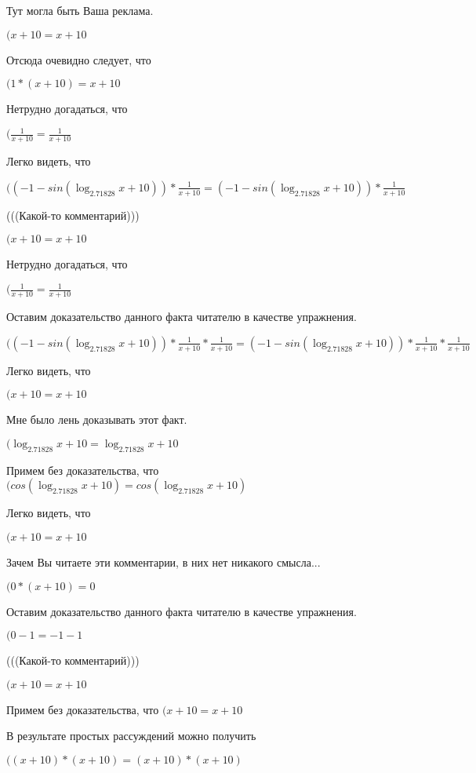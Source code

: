 \documentclass[12pt,a4paper,fleqn]{article}
\theoremstyle{definition}
\begin{document}
Тут могла быть Ваша реклама.

$( x  +  10  =  x  +  10 $

Отсюда очевидно следует, что

$( 1  * ( x  +  10 ) =  x  +  10 $

Нетрудно догадаться, что

$(\frac{ 1 }{ x  +  10 }
 = \frac{ 1 }{ x  +  10 }
$

Легко видеть, что

$(( -1  - sin(\log_{ 2.71828 }{ x  +  10 })) * \frac{ 1 }{ x  +  10 }
 = ( -1  - sin(\log_{ 2.71828 }{ x  +  10 })) * \frac{ 1 }{ x  +  10 }
$

(((Какой-то комментарий)))

$( x  +  10  =  x  +  10 $

Нетрудно догадаться, что

$(\frac{ 1 }{ x  +  10 }
 = \frac{ 1 }{ x  +  10 }
$

Оставим доказательство данного факта читателю в качестве упражнения.

$(( -1  - sin(\log_{ 2.71828 }{ x  +  10 })) * \frac{ 1 }{ x  +  10 }
 * \frac{ 1 }{ x  +  10 }
 = ( -1  - sin(\log_{ 2.71828 }{ x  +  10 })) * \frac{ 1 }{ x  +  10 }
 * \frac{ 1 }{ x  +  10 }
$

Легко видеть, что

$( x  +  10  =  x  +  10 $

Мне было лень доказывать этот факт.

$(\log_{ 2.71828 }{ x  +  10 } = \log_{ 2.71828 }{ x  +  10 }$

Примем без доказательства, что
$(cos(\log_{ 2.71828 }{ x  +  10 }) = cos(\log_{ 2.71828 }{ x  +  10 })$

Легко видеть, что

$( x  +  10  =  x  +  10 $

Зачем Вы читаете эти комментарии, в них нет никакого смысла...

$( 0  * ( x  +  10 ) =  0 $

Оставим доказательство данного факта читателю в качестве упражнения.

$( 0  -  1  =  -1  -  1 $

(((Какой-то комментарий)))

$( x  +  10  =  x  +  10 $

Примем без доказательства, что
$( x  +  10  =  x  +  10 $

В результате простых рассуждений можно получить

$(( x  +  10 ) * ( x  +  10 ) = ( x  +  10 ) * ( x  +  10 )$
\end{document}
